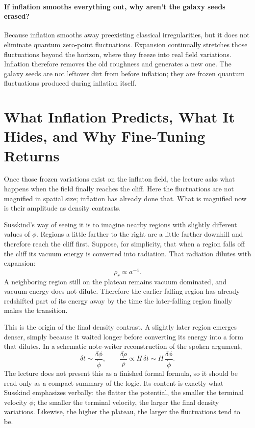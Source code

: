 \paragraph{If inflation smooths everything out, why aren't the galaxy seeds erased?}

Because inflation smooths away preexisting classical irregularities, but it does not eliminate quantum zero-point fluctuations. Expansion continually stretches those fluctuations beyond the horizon, where they freeze into real field variations. Inflation therefore removes the old roughness and generates a new one. The galaxy seeds are not leftover dirt from before inflation; they are frozen quantum fluctuations produced during inflation itself.

\section{What Inflation Predicts, What It Hides, and Why Fine-Tuning Returns}

Once those frozen variations exist on the inflaton field, the lecture asks what happens when the field finally reaches the cliff. Here the fluctuations are not magnified in spatial size; inflation has already done that. What is magnified now is their amplitude as density contrasts.

Susskind's way of seeing it is to imagine nearby regions with slightly different values of \(\phi\). Regions a little farther to the right are a little farther downhill and therefore reach the cliff first. Suppose, for simplicity, that when a region falls off the cliff its vacuum energy is converted into radiation. That radiation dilutes with expansion:
\begin{equation}
\rho_r\propto a^{-4}.
\end{equation}
A neighboring region still on the plateau remains vacuum dominated, and vacuum energy does not dilute. Therefore the earlier-falling region has already redshifted part of its energy away by the time the later-falling region finally makes the transition.

This is the origin of the final density contrast. A slightly later region emerges denser, simply because it waited longer before converting its energy into a form that dilutes. In a schematic note-writer reconstruction of the spoken argument,
\begin{equation}
\delta t\sim \frac{\delta\phi}{\dot\phi},
\qquad
\frac{\delta\rho}{\rho}\propto H\,\delta t
\sim H\,\frac{\delta\phi}{\dot\phi}.
\end{equation}
The lecture does not present this as a finished formal formula, so it should be read only as a compact summary of the logic. Its content is exactly what Susskind emphasizes verbally: the flatter the potential, the smaller the terminal velocity \(\dot\phi\); the smaller the terminal velocity, the larger the final density variations. Likewise, the higher the plateau, the larger the fluctuations tend to be.

